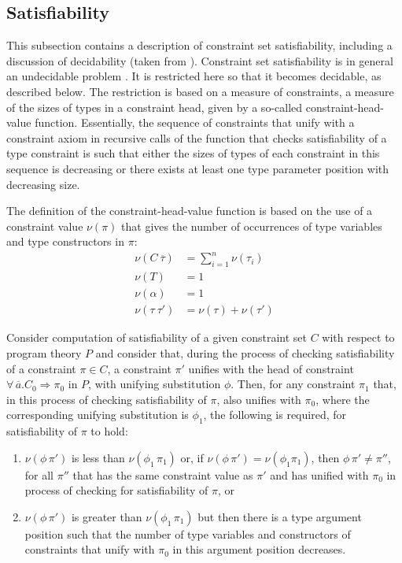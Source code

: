 \subsection{Satisfiability}
\label{sec:satisfiability}

This subsection contains a description of constraint set
satisfiability, including a discussion of decidability (taken from
\cite{Ambiguity-and-context-dependent-overloading}). Constraint set
satisfiability is in general an undecidable problem
\cite{Smith-PhD-Thesis91}. It is restricted here so that it becomes
decidable, as described below. The restriction is based on a measure
of constraints, a measure of the sizes of types in a constraint head,
given by a so-called constraint-head-value function. Essentially, the
sequence of constraints that unify with a constraint axiom in
recursive calls of the function that checks satisfiability of a type
constraint is such that either the sizes of types of each constraint
in this sequence is decreasing or there exists at least one type
parameter position with decreasing size.

The definition of the constraint-head-value function is based on the
use of a constraint value $\nu(\pi)$ that gives the number of
occurrences of type variables and type constructors in $\pi$:
  \[ \begin{array}{ll}
        \nu(C\: \overline{\tau}) & = \sum_{i=1}^n \nu(\tau_i)\\
        \nu(T)                   & = 1\\
        \nu(\alpha)              & = 1\\
        \nu(\tau\: \tau')        & = \nu(\tau) + \nu(\tau')
     \end{array}
  \]

Consider computation of satisfiability of a given constraint set $C$
with respect to program theory $P$ and consider that, during the
process of checking satisfiability of a constraint $\pi\in C$, a
constraint $\pi'$ unifies with the head of constraint $\forall\,
\overline{a}.C_0 \Rightarrow \pi_0$ in $P$, with unifying
substitution $\phi$. Then, for any constraint $\pi_1$ that, in this
process of checking satisfiability of $\pi$, also unifies with
$\pi_0$, where the corresponding unifying substitution is $\phi_1$,
the following is required, for satisfiability of $\pi$ to hold:

\begin{enumerate}
\item $\nu(\phi\,\pi')$ is less than $\nu(\phi_1\,\pi_1)$ or, if
  $\nu(\phi\, \pi')=\nu(\phi_1 \pi_1)$, then $\phi\,\pi' \not= \pi''$,
  for all $\pi''$ that has the same constraint value as $\pi'$ and has
  unified with $\pi_0$ in process of checking for satisfiability of
  $\pi$, or

\item $\nu(\phi\,\pi')$ is greater than $\nu(\phi_1\,\pi_1)$ but then
  there is a type argument position such that the number of type
  variables and constructors of constraints that unify with $\pi_0$ in
  this argument position decreases.

\end{enumerate}

